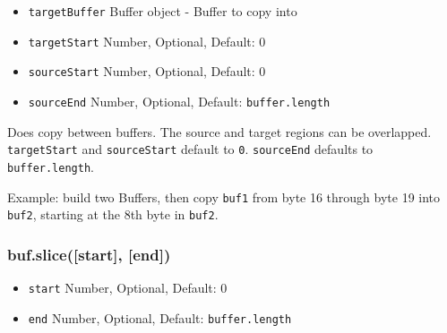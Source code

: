\begin{itemize}
\item
  \texttt{targetBuffer} Buffer object - Buffer to copy into
\item
  \texttt{targetStart} Number, Optional, Default: 0
\item
  \texttt{sourceStart} Number, Optional, Default: 0
\item
  \texttt{sourceEnd} Number, Optional, Default: \texttt{buffer.length}
\end{itemize}

Does copy between buffers. The source and target regions can be
overlapped. \texttt{targetStart} and \texttt{sourceStart} default to
\texttt{0}. \texttt{sourceEnd} defaults to \texttt{buffer.length}.

Example: build two Buffers, then copy \texttt{buf1} from byte 16 through
byte 19 into \texttt{buf2}, starting at the 8th byte in \texttt{buf2}.

\begin{Shaded}
\begin{Highlighting}[]
 \NormalTok{);}
 \NormalTok{);}

 \NormalTok{(}   
  \NormalTok{; }
  \NormalTok{; }
\NormalTok{\}}

\NormalTok{, }\NormalTok{, }\NormalTok{);}
\NormalTok{(}\NormalTok{(}\NormalTok{, }\NormalTok{, }\NormalTok{));}

\end{Highlighting}
\end{Shaded}

\subsubsection{buf.slice({[}start{]}, {[}end{]})}

\begin{itemize}
\item
  \texttt{start} Number, Optional, Default: 0
\item
  \texttt{end} Number, Optional, Default: \texttt{buffer.length}
\end{itemize}


